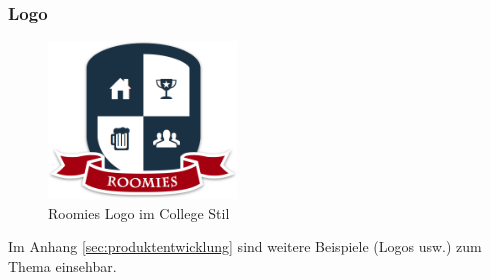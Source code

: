 \subsubsection*{Logo}
\begin{figure}[H]
	\centering
	\includegraphics[width=5cm]{content/images/roomies-withshadow.png}
	\caption{Roomies Logo im College Stil}
\end{figure}

Im Anhang \ref{sec:produktentwicklung} sind weitere Beispiele (Logos usw.) zum Thema \emph{} einsehbar.